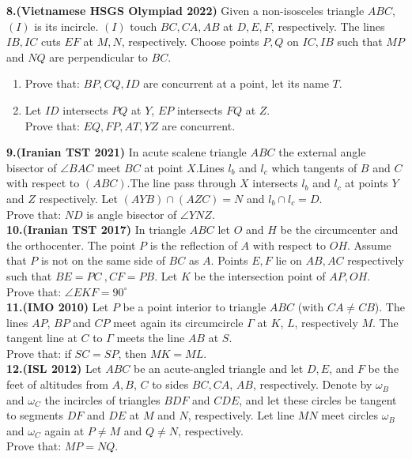 \documentclass[a4paper,12pt,twoside]{book}
\begin{document}
{\textbf{8.(Vietnamese HSGS Olympiad 2022)} Given a non-isosceles triangle $ABC$, $(I)$ is its incircle. $(I)$ touch $BC,CA,AB$ at $D,E,F$, respectively. The lines $IB, IC$ cuts $EF$ at $M,N$, respectively. Choose points $P,Q$ on $IC,IB$ such that $MP$ and $NQ$ are perpendicular to $BC$.
\begin{enumerate}
	\item Prove that: $BP,CQ,ID$ are concurrent at a point, let its name $T$.
	\item Let $ID$ intersects $PQ$ at $Y$, $EP$ intersects $FQ$ at $Z$.\\Prove that: $EQ, FP, AT, YZ$ are concurrent. 
\end{enumerate}  

\textbf{9.(Iranian TST 2021)} In acute scalene triangle $ABC$ the external angle bisector of $\angle BAC$ meet $BC$ at point $X$.Lines $l_b$ and $l_c$ which tangents of $B$ and $C$ with respect to $(ABC)$.The line pass through $X$ intersects $l_b$ and $l_c$ at points $Y$ and $Z$ respectively. Let $(AYB)\cap(AZC)=N$ and $l_b\cap l_c=D$.\\
Prove that: $ND$ is angle bisector of $\angle YNZ$.\\

\textbf{10.(Iranian TST 2017)} In triangle $ABC$ let $O$ and $H$ be the circumcenter and the orthocenter. The point $P$ is the reflection of $A$ with respect to $OH$. Assume that $P$ is not on the same side of $BC$ as $A$. Points $E,F$ lie on $AB,AC$ respectively such that $BE=PC \ ,  CF=PB$. Let $K$ be the intersection point of $AP,OH$.\\Prove that: $\angle EKF = 90 ^{\circ}$\\

\textbf{11.(IMO 2010)} Let $P$ be a point interior to triangle $ABC$ (with $CA \neq CB$). The lines $AP$, $BP$ and $CP$ meet again its circumcircle $\Gamma$ at $K$, $L$, respectively $M$. The tangent line at $C$ to $\Gamma$ meets the line $AB$ at $S$.\\ Prove that: if $SC = SP$, then $MK = ML$.\\

\textbf{12.(ISL 2012)} Let $ABC$ be an acute-angled triangle and let $D, E$, and $F$ be the feet of altitudes from $A, B$, $C$ to sides $BC, CA$, $AB$, respectively. Denote by $\omega_B$ and $\omega_C$ the incircles of triangles $BDF$ and $CDE$, and let these circles be tangent to segments $DF$ and $DE$ at $M$ and $N$, respectively. Let line $MN$ meet circles $\omega_B$ and $\omega_C$ again at $P \ne M$ and $Q \ne N$, respectively.\\Prove that: $MP = NQ$.\\

}
\end{document}
